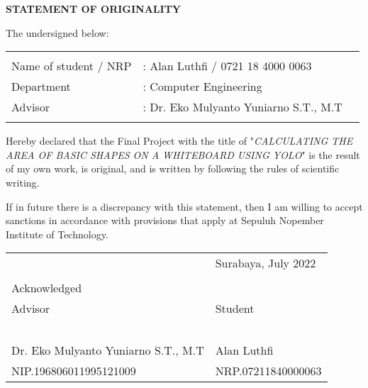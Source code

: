 \begin{center}
	\large
	\textbf{STATEMENT OF ORIGINALITY}
\end{center}

\thispagestyle{empty}

\vspace{2ex}


\noindent The undersigned below:

\noindent\begin{tabularx}{\textwidth}{X X l}
	& \\
	Name of student / NRP &: Alan Luthfi / 0721 18 4000 0063 \\
	Department &: Computer Engineering \\
	Advisor &: Dr. Eko Mulyanto Yuniarno S.T., M.T \\
	& \\
\end{tabularx}

Hereby declared that the Final Project with the title of "\emph{CALCULATING THE AREA OF BASIC SHAPES ON A WHITEBOARD USING YOLO}" is the result of my own work, is original, and is written by following the rules of scientific writing.

If in future there is a discrepancy with this statement, then I am willing to accept sanctions in accordance with provisions that apply at Sepuluh Nopember Institute of Technology.

\vspace{8ex}

\noindent\begin{tabularx}{\textwidth}{X l}
	& Surabaya, July 2022\\
	& \\
	Acknowledged & \\
	Advisor & Student\\
	& \\
	& \\
	& \\
	& \\
	& \\
	Dr. Eko Mulyanto Yuniarno S.T., M.T & Alan Luthfi \\
	NIP.196806011995121009 & NRP.07211840000063 \\
\end{tabularx}